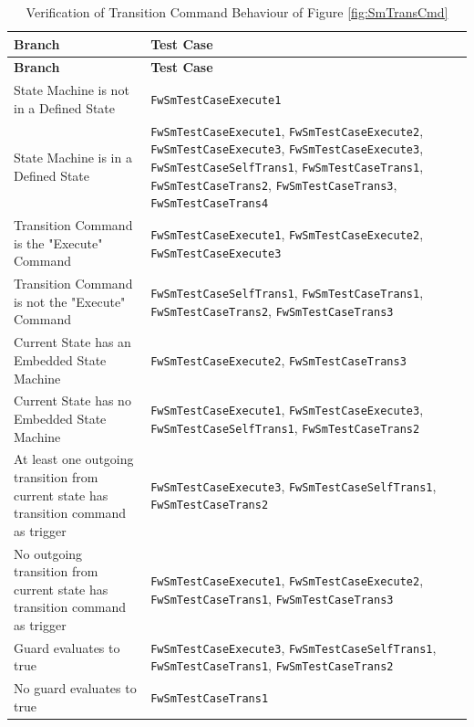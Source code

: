 \documentclass[requirements]{../fwprofile}
\begin{document}
\begin{longtable}{|p{6.7cm}|p{4.5cm}|}
\caption{Verification of Transition Command Behaviour of Figure \ref{fig:SmTransCmd}}
\label{tab:SM_Trans} \\
\hline
\rowcolor{gray}
\textbf{Branch} & \textbf{Test Case} \\
\hline
\endfirsthead
\rowcolor{gray}
\textbf{Branch} & \textbf{Test Case} \\
\hline
\endhead
State Machine is not in a Defined State & \texttt{FwSmTestCaseExecute1} \\
\hline
State Machine is in a Defined State & \texttt{FwSmTestCaseExecute1}, \texttt{FwSmTestCaseExecute2}, \texttt{FwSmTestCaseExecute3}, 
\texttt{FwSmTestCaseExecute3}, \texttt{FwSmTestCaseSelfTrans1}, \texttt{FwSmTestCaseTrans1}, \texttt{FwSmTestCaseTrans2}, 
\texttt{FwSmTestCaseTrans3}, \texttt{FwSmTestCaseTrans4} \\
\hline
Transition Command is the "Execute" Command & \texttt{FwSmTestCaseExecute1}, \texttt{FwSmTestCaseExecute2}, \texttt{FwSmTestCaseExecute3} \\
\hline
Transition Command is not the "Execute" Command & \texttt{FwSmTestCaseSelfTrans1}, \texttt{FwSmTestCaseTrans1}, \texttt{FwSmTestCaseTrans2}, 
\texttt{FwSmTestCaseTrans3} \\
\hline
Current State has an Embedded State Machine & \texttt{FwSmTestCaseExecute2}, \texttt{FwSmTestCaseTrans3} \\
\hline
Current State has no Embedded State Machine & \texttt{FwSmTestCaseExecute1}, \texttt{FwSmTestCaseExecute3}, \texttt{FwSmTestCaseSelfTrans1}, 
\texttt{FwSmTestCaseTrans2} \\
\hline
At least one outgoing transition from current state has transition command as trigger & \texttt{FwSmTestCaseExecute3}, \texttt{FwSmTestCaseSelfTrans1}, 
\texttt{FwSmTestCaseTrans2} \\
\hline
No outgoing transition from current state has transition command as trigger & \texttt{FwSmTestCaseExecute1}, \texttt{FwSmTestCaseExecute2}, 
\texttt{FwSmTestCaseTrans1}, \texttt{FwSmTestCaseTrans3} \\
\hline
Guard evaluates to true & \texttt{FwSmTestCaseExecute3}, \texttt{FwSmTestCaseSelfTrans1}, \texttt{FwSmTestCaseTrans1}, \texttt{FwSmTestCaseTrans2} \\
\hline
No guard evaluates to true & \texttt{FwSmTestCaseTrans1} \\
\hline
\end{longtable}
\end{document}
